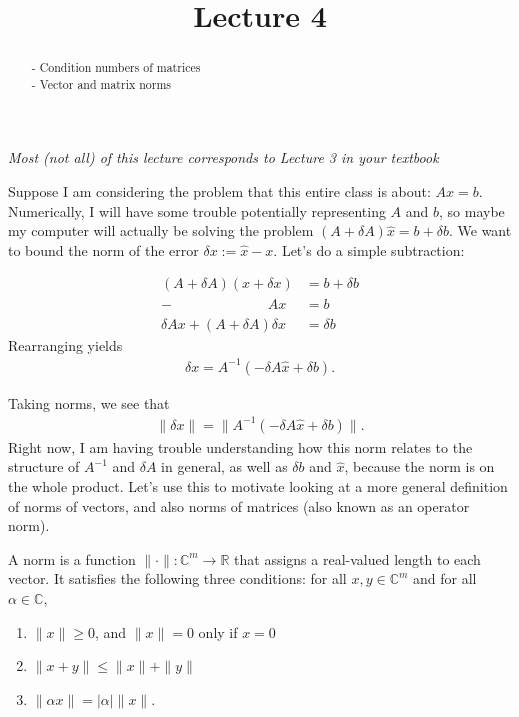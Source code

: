 \documentclass{ximera}
\begin{document}
    \title{Lecture 4}
    
    \begin{abstract} 
    - Condition numbers of matrices \\
    - Vector and matrix norms  \\
    \end{abstract}
    \maketitle

\textit{Most (not all) of this lecture corresponds to Lecture 3 in your textbook}

\vspace{0.1in}

Suppose I am considering the problem that this entire class is about: $Ax = b$.  Numerically, I will have some trouble potentially representing $A$ and $b$, so maybe my computer will actually be solving the problem $(A+\delta A) \hat{x} = b+\delta b$.  We want to bound the norm of the error $\delta x:= \hat{x} - x$.  Let's do a simple subtraction:

\begin{align*}
    (A+\delta A)(x+\delta x) &= b+ \delta b \\
    - \phantom{yoooomannnnn} Ax&=b\\
    \hline
    \delta Ax + (A+\delta A)\delta x &= \delta b
\end{align*}
Rearranging yields
\begin{align}
    \delta x = A^{-1}(-\delta A\hat{x} + \delta b).
\end{align}

Taking norms, we see that 
\begin{align}
    \|\delta x\| = \|A^{-1}(-\delta A\hat{x} + \delta b)\|.
\end{align}
Right now, I am having trouble understanding how this norm relates to the structure of $A^{-1}$ and $\delta A$ in general, as well as $\delta b$ and $\hat{x}$, because the norm is on the whole product.  Let's use this to motivate looking at a more general definition of norms of vectors, and also norms of matrices (also known as an operator norm).

\begin{definition}
    A norm is a function $\|\cdot \|: \mathbb{C}^m \to \mathbb{R}$ that assigns a real-valued length to each vector.  It satisfies the following three conditions: for all $x, y \in \mathbb{C}^m$ and for all $\alpha \in \mathbb{C}$,
    \begin{enumerate}
        \item $\|x\|\geq 0$, and $\|x\| = 0$ only if $x=0$
        \item $\|x+y\| \leq \|x\| + \|y\|$
        \item $\|\alpha x\| = |\alpha|\|x\|$.
    \end{enumerate}
\end{definition}
\end{document}

